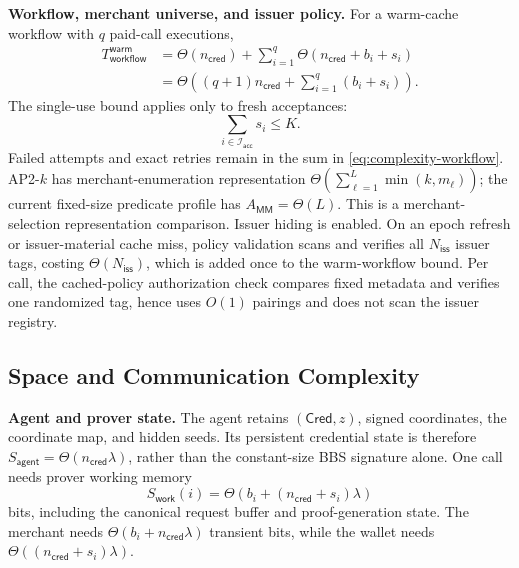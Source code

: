\documentclass[letterpaper]{article}
\begin{document}
\textbf{Workflow, merchant universe, and issuer policy.}
For a warm-cache workflow with \(q\) paid-call executions,
\begin{align}
T_{\mathsf{workflow}}^{\mathsf{warm}}
&=\Theta(n_{\mathsf{cred}})+
  \sum_{i=1}^{q}\Theta(n_{\mathsf{cred}}+b_i+s_i)\nonumber\\
&=\Theta\!\left((q+1)n_{\mathsf{cred}}+
  \sum_{i=1}^{q}(b_i+s_i)\right).
\label{eq:complexity-workflow}
\end{align}
The single-use bound applies only to fresh acceptances:
\begin{equation}
\sum_{i\in\mathcal I_{\mathsf{acc}}}s_i\le K.
\label{eq:complexity-accepted-slots}
\end{equation}
Failed attempts and exact retries remain in the sum in
\cref{eq:complexity-workflow}.  AP2-\(k\) has merchant-enumeration representation
\(\Theta(\sum_{\ell=1}^{L}\min(k,m_\ell))\); the current fixed-size
predicate profile has \(A_{\mathsf{MM}}=\Theta(L)\).  This is a
merchant-selection representation comparison. Issuer hiding is enabled. On an
epoch refresh or issuer-material cache miss, policy validation
scans and verifies all \(N_{\mathsf{iss}}\) issuer tags, costing
\(\Theta(N_{\mathsf{iss}})\), which is added once to the warm-workflow bound.
Per call, the cached-policy authorization
check compares fixed metadata and verifies one randomized tag, hence uses
\(O(1)\) pairings and does not scan the issuer registry.

\subsection{Space and Communication Complexity}

\textbf{Agent and prover state.}
The agent retains \((\mathsf{Cred},z)\), signed coordinates, the coordinate
map, and hidden seeds.  Its persistent credential state is therefore
\(S_{\mathsf{agent}}=\Theta(n_{\mathsf{cred}}\lambda)\), rather than the
constant-size BBS signature alone.  One call needs prover working memory
\begin{equation}
S_{\mathsf{work}}(i)=
\Theta\!\left(b_i+(n_{\mathsf{cred}}+s_i)\lambda\right)
\end{equation}
bits, including the canonical request buffer and proof-generation state.  The
merchant needs \(\Theta(b_i+n_{\mathsf{cred}}\lambda)\) transient bits, while
the wallet needs \(\Theta((n_{\mathsf{cred}}+s_i)\lambda)\).
\end{document}
